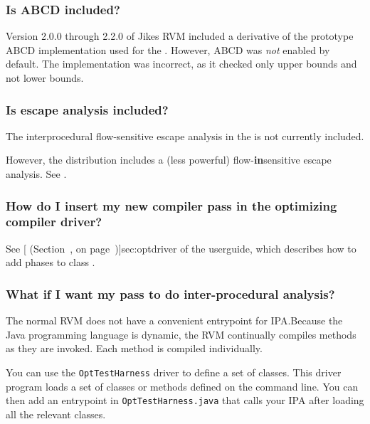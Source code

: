 \subsubsection{Is ABCD included?}
Version 2.0.0 through 2.2.0 of Jikes RVM included a derivative of the
prototype ABCD implementation used for the .  However, ABCD was {\em not} enabled by default.
The implementation was incorrect, as it checked only upper
bounds and not lower bounds. 

\subsubsection{Is escape analysis included?}

The interprocedural flow-sensitive escape analysis in the 
 is not currently included.

However, the distribution includes a (less powerful) flow-{\bf in}\-sen\-si\-tive
escape analysis.  See  
.

\subsubsection{How do I insert my new compiler pass in the optimizing
compiler driver?}

See [
  (Section~\Ref, on page~\Pageref)]{sec:optdriver} of the userguide, which describes how to
add phases to class 
.

\subsubsection{What if I want my pass to do inter-procedural analysis?}

The normal RVM does not have a convenient entrypoint for IPA.\@  Because the
Java programming language is
dynamic, the RVM continually compiles methods as they are
invoked.  Each method is compiled individually.

You can use the {\tt OptTestHarness} driver to define a set of classes. 
This driver program loads a set of classes or methods defined on the
command line.  You can then add an entrypoint in {\tt OptTestHarness.java}
that calls your IPA after loading all the relevant classes.

